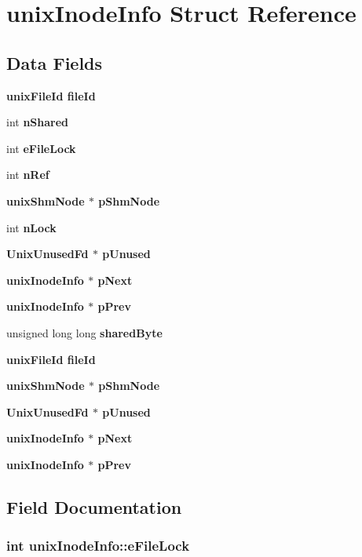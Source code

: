 \section{unix\-Inode\-Info Struct Reference}
\label{structunixInodeInfo}
\subsection*{Data Fields}
\begin{CompactItemize}
\item 
\bf{unix\-File\-Id} \bf{file\-Id}
\item 
int \bf{n\-Shared}
\item 
int \bf{e\-File\-Lock}
\item 
int \bf{n\-Ref}
\item 
\bf{unix\-Shm\-Node} $\ast$ \bf{p\-Shm\-Node}
\item 
int \bf{n\-Lock}
\item 
\bf{Unix\-Unused\-Fd} $\ast$ \bf{p\-Unused}
\item 
\bf{unix\-Inode\-Info} $\ast$ \bf{p\-Next}
\item 
\bf{unix\-Inode\-Info} $\ast$ \bf{p\-Prev}
\item 
unsigned long long \bf{shared\-Byte}
\item 
\bf{unix\-File\-Id} \bf{file\-Id}
\item 
\bf{unix\-Shm\-Node} $\ast$ \bf{p\-Shm\-Node}
\item 
\bf{Unix\-Unused\-Fd} $\ast$ \bf{p\-Unused}
\item 
\bf{unix\-Inode\-Info} $\ast$ \bf{p\-Next}
\item 
\bf{unix\-Inode\-Info} $\ast$ \bf{p\-Prev}
\end{CompactItemize}


\subsection{Field Documentation}
\subsubsection{\setlength{\rightskip}{0pt plus 5cm}int \bf{unix\-Inode\-Info::e\-File\-Lock}}\label{structunixInodeInfo_79437af23989391aec3f748729e15c07}


